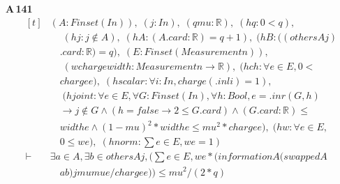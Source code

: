 \noindent\textbf{A\,141}\quad{}
{\footnotesize\[ \begin{aligned}[t]
&(\mathit{A} : \mathit{Finset} (\mathit{I} \mathit{n})),\; (\mathit{j} : \mathit{I} \mathit{n}),\; (\mathit{q} \mathit{mu} : \mathbb{R} ),\; (\mathit{hq} : 0<\mathit{q}),\\
&\quad \; (\mathit{hj} : \mathit{j} \notin \mathit{A}),\; (\mathit{hA} : (\mathit{A}.\mathit{card}:\mathbb{R} )=\mathit{q}+1),\; (\mathit{hB} : ((\mathit{others} \mathit{A} \mathit{j})\\
&\quad .\mathit{card}:\mathbb{R} )=\mathit{q}),\; (\mathit{E} : \mathit{Finset} (\mathit{Measurement} \mathit{n})),\\
&\quad \; (\mathit{w} \mathit{charge} \mathit{width} : \mathit{Measurement} \mathit{n} \to \mathbb{R} ),\; (\mathit{hch} : \forall \mathit{e} \in \mathit{E}, 0 <\\
&\quad \mathit{charge} \mathit{e}),\; (\mathit{hscalar} : \forall \mathit{i} : \mathit{I} \mathit{n}, \mathit{charge} (.\mathit{inl} \mathit{i}) = 1),\\
&\quad \; (\mathit{hjoint} : \forall \mathit{e} \in \mathit{E}, \forall \mathit{G} : \mathit{Finset} (\mathit{I} \mathit{n}), \forall \mathit{h} : \mathit{Bool}, \mathit{e} = .\mathit{inr} (\mathit{G},\mathit{h})\\
&\quad \to \mathit{j} \notin \mathit{G} \wedge (\mathit{h}=\mathit{false} \to 2 \leq \mathit{G}.\mathit{card}) \wedge (\mathit{G}.\mathit{card}:\mathbb{R} ) \leq\\
&\quad \mathit{width} \mathit{e} \wedge (1-\mathit{mu})^{2}*\mathit{width} \mathit{e} \leq \mathit{mu}^{2}*\mathit{charge} \mathit{e}),\; (\mathit{hw} : \forall \mathit{e} \in \mathit{E},\\
&\quad 0 \leq \mathit{w} \mathit{e}),\; (\mathit{hnorm} : \textstyle\sum \mathit{e} \in \mathit{E}, \mathit{w} \mathit{e} = 1)\\
\vdash\;&\exists \mathit{a} \in \mathit{A}, \exists \mathit{b} \in \mathit{others} \mathit{A} \mathit{j}, (\textstyle\sum \mathit{e} \in \mathit{E}, \mathit{w} \mathit{e}*(\mathit{information} \mathit{A} (\mathit{swapped} \mathit{A}\\
&\quad \mathit{a} \mathit{b}) \mathit{j} \mathit{mu} \mathit{mu} \mathit{e}/\mathit{charge} \mathit{e})) \leq \mathit{mu}^{2}/(2*\mathit{q})
\end{aligned} \]}

